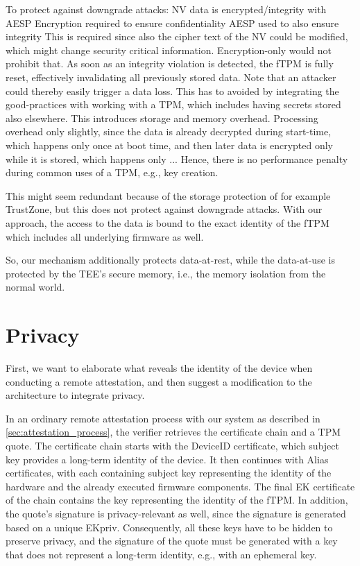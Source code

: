 
To protect against downgrade attacks:
NV data is encrypted/integrity with AESP
Encryption required to ensure confidentiality
AESP used to also ensure integrity
This is required since also the cipher text of the NV could be modified, which might change security critical information.
Encryption-only would not prohibit that.
As soon as an integrity violation is detected, the \ac{fTPM} is fully reset, effectively invalidating all previously stored data.
Note that an attacker could thereby easily trigger a data loss.
This has to avoided by integrating the good-practices with working with a \ac{TPM}, which includes having secrets stored also elsewhere. %
This introduces storage and memory overhead.
Processing overhead only slightly, since the data is already decrypted during start-time, which happens only once at boot time, and then later data is encrypted only while it is stored, which happens only ... %
Hence, there is no performance penalty during common uses of a \ac{TPM}, e.g., key creation.

This might seem redundant because of the storage protection of for example TrustZone, but this does not protect against downgrade attacks. With our approach, the access to the data is bound to the exact identity of the fTPM which includes all underlying firmware as well.

So, our mechanism additionally protects data-at-rest, while the data-at-use is protected by the TEE's secure memory, i.e., the memory isolation from the normal world.


\section{Privacy}
\label{sec:privacy}

First, we want to elaborate what reveals the identity of the device when conducting a remote attestation, and then suggest a modification to the architecture to integrate privacy.

In an ordinary remote attestation process with our system as described in \autoref{sec:attestation_process}, the verifier retrieves the certificate chain and a TPM quote.
The certificate chain starts with the DeviceID certificate, which subject key provides a long-term identity of the device.
It then continues with Alias certificates, with each containing subject key representing the identity of the hardware and the already executed firmware components.
The final EK certificate of the chain contains the key representing the identity of the fTPM.
In addition, the quote's signature is privacy-relevant as well, since the signature is generated based on a unique EKpriv.
Consequently, all these keys have to be hidden to preserve privacy, and the signature of the quote must be generated with a key that does not represent a long-term identity, e.g., with an ephemeral key.

